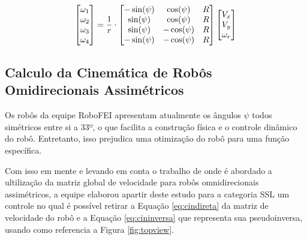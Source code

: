 \documentclass[deposito, acronym, symbols]{fei}
\begin{document}
\begin{equation} \label{eq:simetrica}
\centering  
\begin{bmatrix}\omega_1\\\omega_2\\\omega_3\\\omega_4\end{bmatrix} = \frac{1}{r} \cdot 
   \begin{bmatrix}-\sin(\psi)&\cos(\psi)&R\\
   \sin(\psi)&\cos(\psi)&R\\
   \sin(\psi)&-\cos(\psi)&R\\
   -\sin(\psi)&-\cos(\psi)&R \end{bmatrix}
   \begin{bmatrix}V_x\\V_y\\\omega_r\end{bmatrix}  
\end{equation}
 
\subsection{Calculo da Cinemática de Robôs Omidirecionais Assimétricos}

Os robôs da equipe RoboFEI apresentam atualmente os ângulos $\psi$  todos simétricos entre si a 33º, o que facilita a construção física e o controle dinâmico do robô. Entretanto, isso prejudica uma otimização do robô para uma função específica. 

Com isso em mente e levando em conta o trabalho de \textcite{rojas2005omnidirectional} onde é abordado a ultilização da matriz global de velocidade para robôs omnidirecionais assimétricos, a equipe \textcite{Twente} elaborou apartir deste estudo para a categoria SSL um controle no qual é possível retirar a Equação \ref{eq:cindireta} da matriz de velocidade do robô e a Equação \ref{eq:cininversa} que representa sua pseudoinversa, usando como referencia a Figura \ref{fig:topview}.
\end{document}
